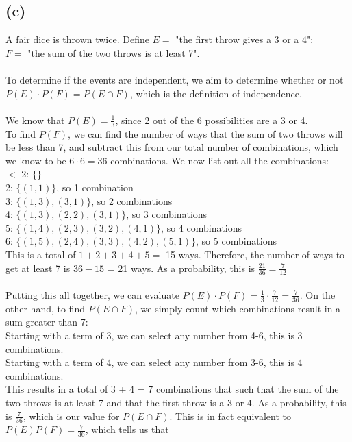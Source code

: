 \documentclass{article}
\begin{document}
{\subsection*{(c)}
A fair dice is thrown twice. Define
$ E =$ "the first throw gives a 3 or a 4"; \\ 
$ F =$ "the sum of the two throws is at least 7".\\ \\
To determine if the events are independent, we aim to determine whether or not $P(E) \cdot P(F) = P(E \cap F)$, which is the definition of independence. \\ \\
We know that $P(E) = \frac{1}{3}$, since 2 out of the 6 possibilities are a 3 or 4. \\ 
To find $P(F)$, we can find the number of ways that the sum of two throws will be less than 7, and subtract this from our total number of combinations, which we know to be $6 \cdot 6 = 36$ combinations. We now list out all the combinations: \\
$<$ 2: $\{\}$\\
2: $\{(1,1)\}$, so 1 combination\\
3: $\{(1,3), (3,1)\}$, so 2 combinations\\
4: $\{(1,3), (2,2), (3,1)\}$, so 3 combinations\\
5: $\{(1,4), (2,3), (3,2), (4,1)\}$, so 4 combinations\\
6: $\{(1,5), (2,4), (3,3), (4,2), (5,1)\}$, so 5 combinations\\
This is a total of $1 + 2 + 3 + 4 + 5 =$ 15 ways. Therefore, the number of ways to get at least 7 is $36 - 15$ = 21 ways. As a probability, this is $\frac{21}{36} = \frac{7}{12}$ \\ \\
Putting this all together, we can evaluate $P(E) \cdot P(F) = \frac{1}{3} \cdot \frac{7}{12} = \frac{7}{36}$. On the other hand, to find $P(E \cap F)$, we simply count which combinations result in a sum greater than 7: \\ 
Starting with a term of 3, we can select any number from 4-6, this is 3 combinations. \\ 
Starting with a term of 4, we can select any number from 3-6, this is 4 combinations. \\ 
This results in a total of 3 + 4 = 7 combinations that such that the sum of the two throws is at least 7 and that the first throw is a 3 or 4. As a probability, this is $\frac{7}{36}$, which is our value for $P(E \cap F)$. This is in fact equivalent to $P(E)P(F) = \frac{7}{36}$, which tells us that 

}
\end{document}
